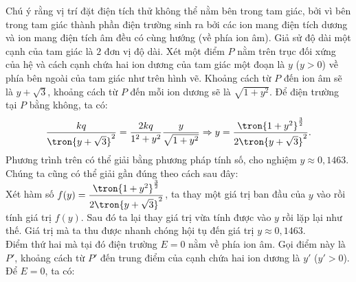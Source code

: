 \begin{loigiai}
\begin{center}
    \end{center}
    Chú ý rằng vị trí đặt điện tích thử không thể nằm bên trong tam giác, bởi vì bên trong tam giác thành phần điện trường sinh ra bởi các ion mang điện tích dương và ion mang điện tích âm đều có cùng hướng (về phía ion âm). Giả sử độ dài một cạnh của tam giác là $2$ đơn vị độ dài. Xét một điểm $P$ nằm trên trục đối xứng của hệ và cách cạnh chứa hai ion dương của tam giác một đoạn là $y$ ($y>0$) về phía bên ngoài của tam giác như trên hình vẽ. Khoảng cách từ $P$ đến ion âm sẽ là $y+\sqrt{3}$, khoảng cách từ $P$ đến mỗi ion dương sẽ là $\sqrt{1+y^2}$. Để điện trường tại $P$ bằng không, ta có:
    \begin{equation*}
            \begin{aligned}
                \dfrac{kq}{\tron{y+\sqrt{3}}^2}=\dfrac{2kq}{1^2+y^2}\dfrac{y}{\sqrt{1+y^2}}\Rightarrow y=\dfrac{\tron{1+y^2}^{\frac{3}{2}}}{2\tron{y+\sqrt{3}}^2}.
            \end{aligned}
        \end{equation*}
        Phương trình trên có thể giải bằng phương pháp tính số, cho nghiệm $y\approx0,1463$. Chúng ta cũng có thể giải gần đúng theo cách sau đây: \\
        Xét hàm số $f(y)=\dfrac{\tron{1+y^2}^{\frac{3}{2}}}{2\tron{y+\sqrt{3}}^2}$, ta thay một giá trị ban đầu của $y$ vào rồi tính giá trị $f(y)$. Sau đó ta lại thay giá trị vừa tính được vào $y$ rồi lặp lại như thế. Giá trị mà ta thu được nhanh chóng hội tụ đến giá trị $y\approx0,1463$.\\
    Điểm thứ hai mà tại đó điện trường $E=0$ nằm về phía ion âm. Gọi điểm này là $P'$, khoảng cách từ $P'$ đến trung điểm của cạnh chứa hai ion dương là $y'$ ($y'>0$). Để $E=0$, ta có:

\end{loigiai}
